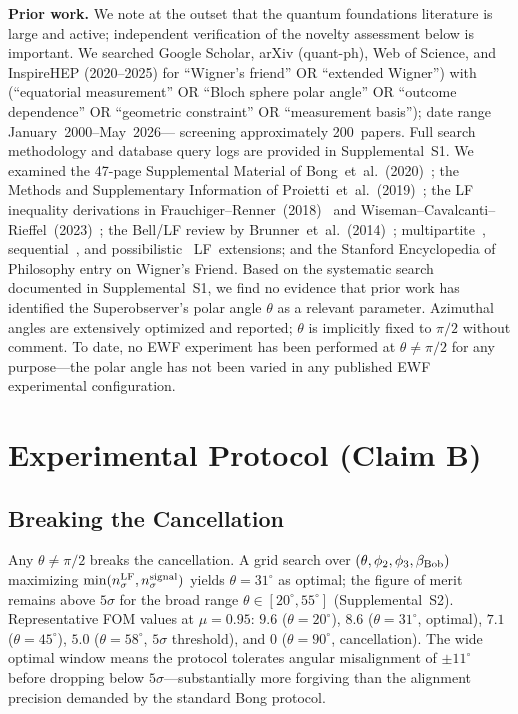\documentclass[twocolumn,aps,pra,superscriptaddress,floatfix,10pt]{revtex4-2}
\begin{document}
\textbf{Prior work.} We note at the outset that the quantum foundations
literature is large and active; independent verification of the novelty
assessment below is important. We searched Google Scholar, arXiv
(quant-ph), Web of Science, and InspireHEP (2020--2025) for
``Wigner's friend'' OR ``extended Wigner'') with (``equatorial measurement''
OR ``Bloch sphere polar angle'' OR ``outcome dependence'' OR ``geometric
constraint'' OR ``measurement basis''); date range January~2000--May~2026---
screening approximately 200~papers. Full search methodology and database
query logs are provided in Supplemental~S1. We examined the 47-page
Supplemental Material of Bong~et~al.~(2020)~\cite{Bong2020};
the Methods and Supplementary Information of
Proietti~et~al.~(2019)~\cite{Proietti2019}; the LF inequality
derivations in Frauchiger--Renner~(2018)~\cite{Frauchiger2018} and
Wiseman--Cavalcanti--Rieffel~(2023)~\cite{Wiseman2023}; the Bell/LF
review by Brunner~et~al.~(2014)~\cite{Brunner2014}; multipartite~\cite{Haddara2024a},
sequential~\cite{Utreras2023}, and possibilistic~\cite{Haddara2023b}
LF~extensions; and the Stanford Encyclopedia of Philosophy entry on
Wigner's Friend. Based on the systematic search documented in
Supplemental~S1, we find no evidence that prior work has identified
the Superobserver's polar angle $\theta$ as a relevant parameter.
Azimuthal angles are extensively optimized and reported; $\theta$ is
implicitly fixed to $\pi/2$ without comment. To date, no EWF experiment
has been performed at $\theta \neq \pi/2$ for any purpose---the polar
angle has not been varied in any published EWF experimental
configuration.

\section{Experimental Protocol (Claim B)}
\label{sec:protocol}

\subsection{Breaking the Cancellation}

Any $\theta \neq \pi/2$ breaks the cancellation. A grid search over
$(\theta, \phi_2, \phi_3, \beta_{\rm Bob})$ maximizing
$\min(n_\sigma^{\rm LF}, n_\sigma^{\rm signal})$ yields
$\theta = 31^\circ$ as optimal; the figure of merit remains above
$5\sigma$ for the broad range $\theta \in [20^\circ, 55^\circ]$
(Supplemental~S2). Representative FOM values at $\mu = 0.95$:
$9.6$ ($\theta = 20^\circ$), $8.6$ ($\theta = 31^\circ$, optimal),
$7.1$ ($\theta = 45^\circ$), $5.0$ ($\theta = 58^\circ$, $5\sigma$
threshold), and $0$ ($\theta = 90^\circ$, cancellation). The wide
optimal window means the protocol tolerates angular misalignment of
$\pm 11^\circ$ before dropping below $5\sigma$---substantially more
forgiving than the alignment precision demanded by the standard
Bong protocol.
\end{document}
